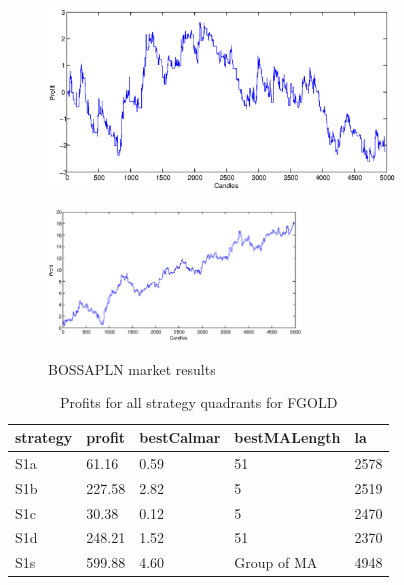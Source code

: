 \documentclass{tewiart}
\begin{document}
\begin{figure}[h]
\begin{minipage}{.49\linewidth}
\centering 
\includegraphics[width=0.82\textwidth]{images/S1d_bossa.eps}
\label{mansard}
\end{minipage}
\begin{minipage}{\linewidth}
\centering 
\includegraphics[width=0.6\textwidth]{images/S1s_bossa.eps}
\label{mansard}
\end{minipage}
\caption{BOSSAPLN market results}
\end{figure}
\FloatBarrier




\newpage
\begin{table}[!t]
\caption{Profits for all strategy quadrants for FGOLD} 
 \begin{center} 
 \begin{tabular}{|l|l|l|l|l|} 
 \hline \textbf{strategy} & \textbf{profit} & \textbf{bestCalmar} & \textbf{bestMALength} & \textbf{la} \\ \hline  
S1a & 61.16 & 0.59 & 51 & 2578\\ \hline 
S1b & 227.58 & 2.82 & 5 & 2519\\ \hline 
S1c & 30.38 & 0.12 & 5 & 2470\\ \hline 
S1d & 248.21 & 1.52 & 51 & 2370\\ \hline 
S1s & 599.88 & 4.60 & Group of MA & 4948\\ 
\hline \end{tabular} 
 \end{center} 
 \end{table}
\FloatBarrier
\end{document}
